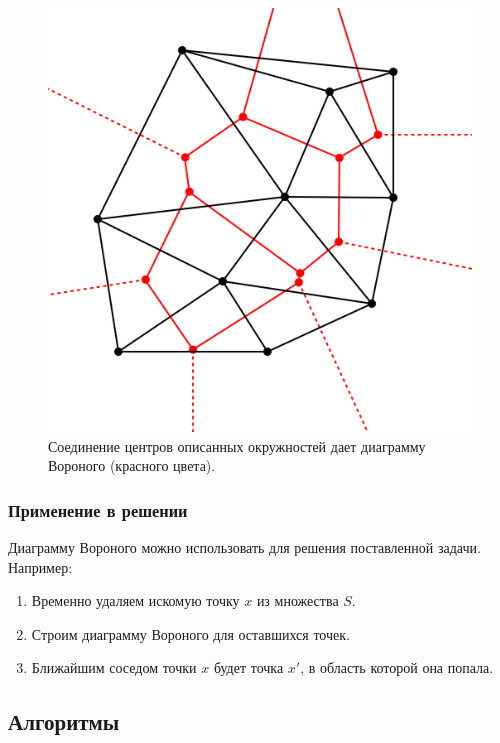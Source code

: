 \begin{figure}[H]
\begin{center}
\begin{minipage}[h]{0.45\linewidth}
            \includegraphics[width=1\linewidth]{delaunay-voronoi.png}
            \caption{Соединение центров описанных окружностей дает диаграмму Вороного (красного цвета).}
        \end{minipage}
    \end{center}
\end{figure}

\subsubsection*{Применение в решении}

Диаграмму Вороного можно использовать для решения поставленной задачи. Например:
\begin{enumerate}
    \item Временно удаляем искомую точку $x$ из множества $S$.
    \item Строим диаграмму Вороного для оставшихся точек.
    \item Ближайшим соседом точки $x$ будет точка $x'$, в область которой она попала.
\end{enumerate}

\newpage

\subsection{Алгоритмы}


